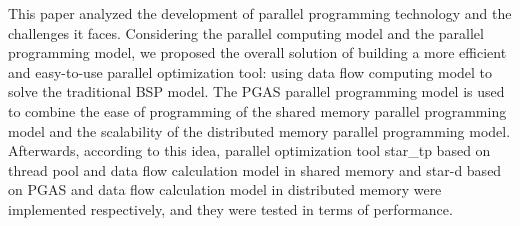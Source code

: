 This paper analyzed the development of parallel programming technology and the challenges it faces. Considering the parallel computing model and the parallel programming model, we proposed the overall solution of building a more efficient and easy-to-use parallel optimization tool: using data flow computing model to solve the traditional BSP model. The PGAS parallel programming model is used to combine the ease of programming of the shared memory parallel programming model and the scalability of the distributed memory parallel programming model. Afterwards, according to this idea, parallel optimization tool star\_tp based on thread pool and data flow calculation model in shared memory and star-d based on PGAS and data flow calculation model in distributed memory were implemented respectively, and they were tested in terms of performance.

